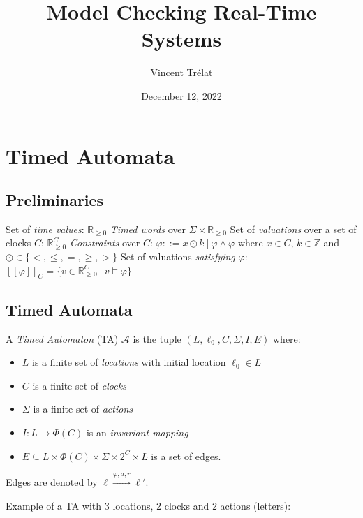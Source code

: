 \documentclass{beamer}
\title[Model Checking Real-Time Systems]{Model Checking Real-Time Systems}
\date{December 12, 2022}
\author[V. Trélat]{Vincent Trélat}
\institute[TUM]{Technical University of Munich}
\theoremstyle{definition}
\begin{document}
\begin{frame}
\titlepage
\end{frame}

\begin{frame}
\tableofcontents
\end{frame}

\section{Timed Automata}
\subsection{Preliminaries}

\begin{frame}
  \tableofcontents[currentsection]
\end{frame}

\begin{frame}
  Set of \emph{time values}: $\mathbb{R}_{\geq 0}$
  \vfill
  \emph{Timed words} over $\Sigma \times \mathbb{R}_{\geq 0}$
  \vfill
  Set of \emph{valuations} over a set of clocks $C$: $\mathbb{R}_{\geq 0}^C$
  \vfill
  \emph{Constraints} over $C$: $\varphi ::= x \odot k\ |\ \varphi \land \varphi$ where $x \in C$, $k \in \mathbb{Z}$ and $\odot \in \{<, \leq, =, \geq, >\}$
  \vfill
  Set of valuations \emph{satisfying} $\varphi$: $[\![\varphi]\!]_C = \{v \in \mathbb{R}_{\geq 0}^C\ |\ v \models \varphi\}$
\end{frame}


\subsection{Timed Automata}

\begin{frame}
  \begin{definition}
    A \emph{Timed Automaton} (TA) $\mathcal{A}$ is the tuple $(L, \ell_0, C, \Sigma, I, E)$ where:
    \begin{itemize}
      \item $L$ is a finite set of \emph{locations} with initial location $\ell_0 \in L$
      \item $C$ is a finite set of \emph{clocks}
      \item $\Sigma$ is a finite set of \emph{actions}
      \item $I \colon L \to \varPhi(C)$ is an \emph{invariant mapping}
      \item $E \subseteq L \times \varPhi(C) \times \Sigma \times 2^{C} \times L$ is a set of edges.
    \end{itemize}
  \end{definition}
  \vfill
  Edges are denoted by $\ell \xrightarrow{\varphi, a, r} \ell'$.
\end{frame}
\begin{frame}
  Example of a TA with 3 locations, 2 clocks and 2 actions (letters):
\end{frame}
\end{document}
